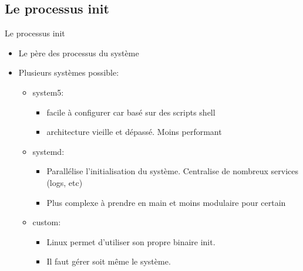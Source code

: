 \subsection{Le processus init}
\begin{frame}{Le processus init}
  \begin{itemize}
  \item Le père des processus du système
  \item Plusieurs systèmes possible:
    \begin{itemize}
    \item system5:
      \begin{itemize}
      \item facile à configurer car basé sur des scripts shell
      \item architecture vieille et dépassé. Moins performant
      \end{itemize}
    \item systemd:
      \begin{itemize}
      \item Parallélise l'initialisation du système. Centralise de nombreux services (logs, etc)
      \item Plus complexe à prendre en main et moins modulaire pour certain
      \end{itemize}
    \item custom:
      \begin{itemize}
      \item Linux permet d'utiliser son propre binaire init.
      \item Il faut gérer soit même le système.
      \end{itemize}
    \end{itemize}
  \end{itemize}
\end{frame}
